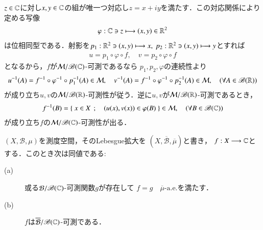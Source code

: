 		\begin{prf}
			$z \in \mathbb{C}$に対し$x,y \in \mathbb{C}$の組が唯一つ対応し$z = x + i y$を満たす．この対応関係により定める写像
			\begin{align}
				\varphi:\mathbb{C} \ni z \longmapsto (x,y) \in \mathbb{R}^2
			\end{align}
			は位相同型である．射影を$p_1:\mathbb{R}^2 \ni (x,y) \longmapsto x,
			\ p_2:\mathbb{R}^2 \ni (x,y) \longmapsto y$とすれば
			\begin{align}
				u = p_1 \circ \varphi \circ f,
				\quad v = p_2 \circ \varphi \circ f
			\end{align}
			となるから，$f$が$\mathcal{M}/\mathscr{B}(\mathbb{C})$-可測であるなら
			$p_1,p_2,\varphi$の連続性より
			\begin{align}
				u^{-1}(A) = f^{-1} \circ \varphi^{-1} \circ p_1^{-1}(A) \in \mathcal{M},
				\quad v^{-1}(A) = f^{-1} \circ \varphi^{-1} \circ p_2^{-1}(A) \in \mathcal{M},
				\quad (\forall A \in \mathscr{B}(\mathbb{R}))
			\end{align}
			が成り立ち$u,v$の$\mathcal{M}/\mathscr{B}(\mathbb{R})$-可測性が従う．逆に$u,v$が$\mathcal{M}/\mathscr{B}(\mathbb{R})$-可測であるとき，
			\begin{align}
				f^{-1}(B) = \left\{\ x \in X\ \, ; \quad (u(x),v(x)) \in \varphi(B)\ \right\} \in \mathcal{M},
				\quad (\forall B \in \mathscr{B}(\mathbb{C}))
			\end{align}
			が成り立ち$f$の$\mathcal{M}/\mathscr{B}(\mathbb{C})$-可測性が出る．
			\QED
		\end{prf}
	
		\begin{screen}
			\begin{thm}
				$(X,\mathcal{B},\mu)$を測度空間，そのLebesgue拡大を
				$\left( X,\overline{\mathcal{B}},\overline{\mu} \right)$と書き，
				$f:X \longrightarrow \mathbb{C}$とする．このとき次は同値である:
				\begin{description}
					\item[(a)] 或る$\mathcal{B}/\mathscr{B}(\mathbb{C})$-可測関数$g$が存在して
						$f = g\quad \mbox{$\overline{\mu}$-a.e.}$を満たす．
					\item[(b)] $f$は$\overline{\mathcal{B}}/\mathscr{B}(\mathbb{C})$-可測である．
				\end{description}
			\end{thm}
		\end{screen}
		
